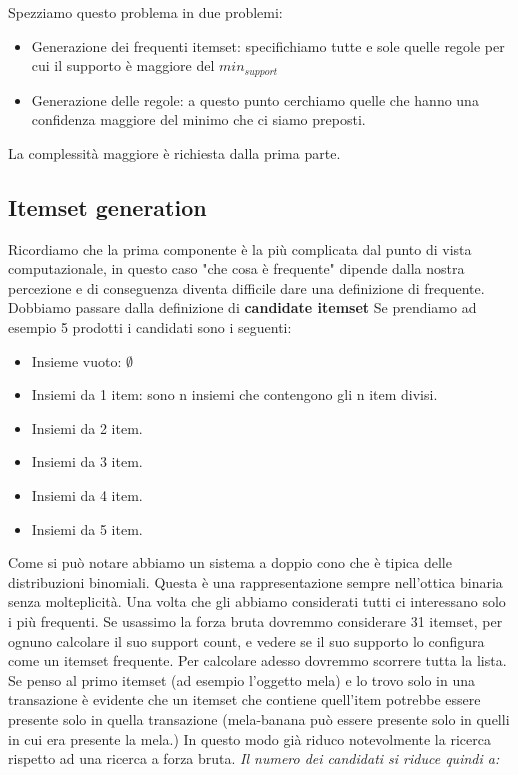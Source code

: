\documentclass[12pt, a4paper,titlepage,openany]{article}
\begin{document}
Spezziamo questo problema in due problemi:
\begin{itemize}
	\item Generazione dei frequenti itemset: specifichiamo tutte e sole quelle regole per cui il supporto è maggiore del $min_{support}$
	\item Generazione delle regole: a questo punto cerchiamo quelle che hanno una confidenza maggiore del minimo che ci siamo preposti.
\end{itemize}

La complessità maggiore è richiesta dalla prima parte.

\subsection{Itemset generation}

Ricordiamo che la prima componente è la più complicata dal punto di vista computazionale, in questo caso "che cosa è frequente" dipende dalla nostra percezione e di conseguenza diventa difficile dare una definizione di frequente. Dobbiamo passare dalla definizione di \textbf{candidate itemset} Se prendiamo ad esempio 5 prodotti i candidati sono i seguenti:
\begin{itemize}
	\item Insieme vuoto: $\emptyset$
	\item Insiemi da 1 item: sono n insiemi che contengono gli n item divisi.
	\item Insiemi da 2 item.
	\item Insiemi da 3 item.
	\item Insiemi da 4 item.
	\item Insiemi da 5 item.
\end{itemize}

Come si può notare abbiamo un sistema a doppio cono che è tipica delle distribuzioni binomiali. Questa è una rappresentazione sempre nell'ottica binaria senza molteplicità. Una volta che gli abbiamo considerati tutti ci interessano solo i più frequenti. Se usassimo la forza bruta dovremmo considerare 31 itemset, per ognuno calcolare il suo support count, e vedere se il suo supporto lo configura come un itemset frequente. Per calcolare adesso dovremmo scorrere tutta la lista. Se penso al primo itemset (ad esempio l'oggetto mela) e lo trovo solo in una transazione è evidente che un itemset che contiene quell'item potrebbe essere presente solo in quella transazione (mela-banana può essere presente solo in quelli in cui era presente la mela.) In questo modo già riduco notevolmente la ricerca rispetto ad una ricerca a forza bruta. \textit{Il numero dei candidati si riduce quindi a:}
\end{document}
